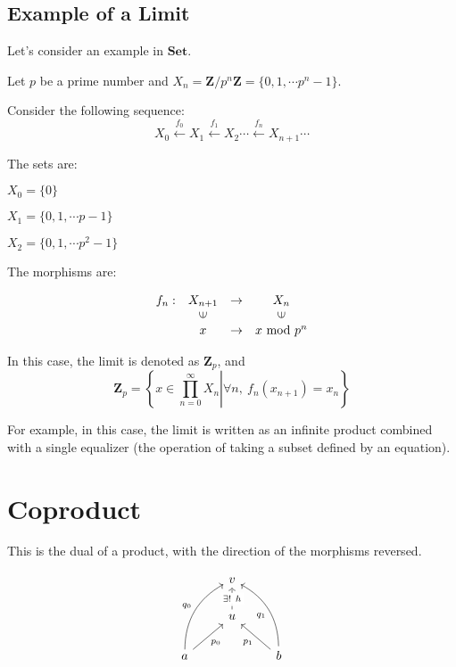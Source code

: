 \documentclass[uplatex,a4j,12pt,dvipdfmx]{jsarticle}
\begin{document}
\subsection{Example of a Limit}

Let's consider an example in $\textbf{Set}$.

Let $p$ be a prime number and $X_{n} = \mathbf{Z} / p^{n} \mathbf{Z} = \{ 0, 1, \cdots p^{n} -1 \}$.

Consider the following sequence:
$$
	X_{0} \xleftarrow{f_{0}} X_{1} \xleftarrow{f_{1}} X_{2} \cdots \xleftarrow{f_{n}} X_{n+1} \cdots
$$

The sets are:

$X_{0} = \{ 0 \}$

$X_{1} = \{ 0, 1, \cdots p-1 \}$

$X_{2} = \{ 0, 1, \cdots p^{2}-1 \}$

The morphisms are:

\[
	\begin{array}{cccc}
		f_{n} : & X_{n+1}                 & \to & X_{n}                   \\
		        & \rotatebox{90}{${\in}$} &     & \rotatebox{90}{${\in}$} \\
		        & x                       & \to & x \ \text{mod} \ p^{n}
	\end{array}
\]

In this case, the limit is denoted as $\mathbf{Z}_{p}$, and
$$
	\mathbf{Z}_{p}
	= \left. \left\{ x \in \prod^{\infty}_{n=0} X_{n} \right| \forall n , \ f_{n}(x_{n+1}) = x_{n} \right\}
$$

For example, in this case, the limit is written as an infinite product combined with a single equalizer (the operation of taking a subset defined by an equation).



\section{Coproduct}

This is the dual of a product, with the direction of the morphisms reversed.

\[
	\begin{tikzcd}
		& v&\\
		& u \arrow[u, "\exists ! \ h" description, dashed] &\\
		a \arrow[ru, "p_{0}"'] \arrow[ruu, "q_{0}", bend left] && b \arrow[lu, "p_{1}"] \arrow[luu, "q_{1}", bend right]
	\end{tikzcd}
\]
\end{document}
